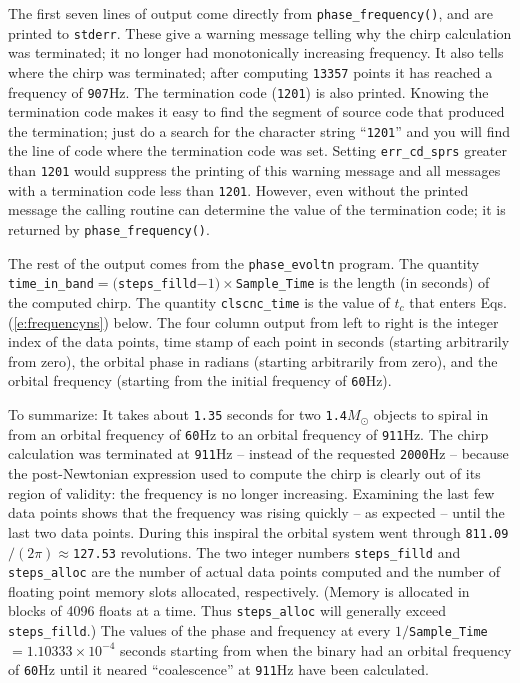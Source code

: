 The first seven lines of output come directly from {\tt phase\_frequency()},
and are printed to {\tt stderr}.
These give a warning message telling why the chirp calculation was terminated;
it no longer had monotonically increasing frequency.
It also tells where the chirp was terminated;
after computing {\tt 13357} points it has reached a frequency of {\tt 907}Hz.
The termination code ({\tt 1201}) is also printed. Knowing the termination
code makes it easy to find the segment of source code that produced the
termination; just do a search for the character string ``{\tt 1201}'' 
and you will find the line of code where the termination code was set.
Setting {\tt err\_cd\_sprs} greater than {\tt 1201} would suppress
the printing of this warning message and all messages with
a termination code less than {\tt 1201}.  
However, even without the
printed message the calling routine  can
determine the value of the termination code; it is returned
by {\tt phase\_frequency()}.

The rest of the output comes from the
{\tt phase\_evoltn} program. The quantity 
{\tt time\_in\_band}$=(${\tt steps\_filld}$-1)\times${\tt Sample\_Time}
is the length (in seconds) of the computed chirp.
The quantity {\tt clscnc\_time} is the value of
$t_c$ that enters Eqs.(\ref{e:frequencyns}) below.
The four column output from left to right is the integer
index of the data points, time stamp of each point in seconds (starting
arbitrarily from zero), the orbital phase in radians (starting arbitrarily
from zero), and the orbital frequency (starting from
the initial frequency of {\tt 60}Hz).

To summarize:
It takes about {\tt 1.35} seconds
for two {\tt 1.4}$M_\odot$ objects to spiral in from an orbital
frequency of {\tt60}Hz to an orbital frequency of {\tt 911}Hz.
The chirp calculation was terminated at {\tt 911}Hz -- instead of the
requested {\tt 2000}Hz -- 
because the post-Newtonian expression used to compute
the chirp is clearly out of its region of validity:
the frequency is no longer increasing.
Examining the last few data points shows that the frequency was
rising quickly -- as expected -- until the last two data points.
During this inspiral the orbital system went through
{\tt 811.09}$/(2 \pi)\approx ${\tt 127.53} revolutions.
The two integer numbers {\tt steps\_filld} and {\tt steps\_alloc}
are the number of actual data points computed and the number
of floating point memory slots allocated, respectively.
(Memory is allocated in blocks of 4096 floats at a time. Thus
{\tt steps\_alloc} will generally exceed  {\tt steps\_filld}.)
The  values of the
phase and frequency at every $1/${\tt Sample\_Time}$=1.10333\times10^{-4}$
seconds starting from when the binary had an orbital frequency of
{\tt 60}Hz until it neared ``coalescence'' at {\tt 911}Hz have
been calculated.
\clearpage

